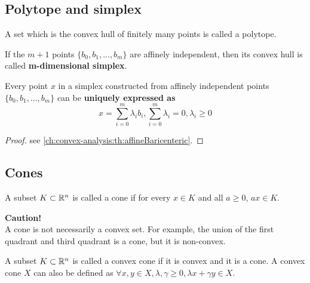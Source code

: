 \begin{refsection}
\subsection{Polytope and simplex}
\begin{definition}[polytope]\cite[12]{rockafellar1997convex}
A set which is the convex hull of finitely many points is called a polytope.
\end{definition}

\begin{definition}[simplex]\cite[12]{rockafellar1997convex}
If the $m+1$ points $\{b_0,b_1,...,b_m\}$ are affinely independent, then its convex hull is called \textbf{m-dimensional simplex}.
\end{definition}


\begin{theorem}
Every point $x$ in a simplex constructed from affinely independent points $\{b_0,b_1,...,b_m\}$ can be \textbf{uniquely expressed as}
$$x = \sum_{i=0}^m \lambda_i b_i, \sum_{i=0}^m \lambda_i = 0,\lambda_i \geq 0$$
\end{theorem}
\begin{proof}
see \autoref{ch:convex-analysis:th:affineBaricenteric}.
\end{proof}


\subsection{Cones}

\begin{definition}[cone]
	A subset $K \subset \mathbb{R}^n$ is called a cone if for every $x\in K$ and all $a \geq 0$, $ax\in K$.
\end{definition}

\begin{mdframed}
	\textbf{Caution!}\\
	A cone is not necessarily a convex set. For example, the union of the first quadrant and third quadrant is a cone, but it is non-convex.
\end{mdframed}


\begin{definition}
	A subset $K \subset \mathbb{R}^n$ is called a convex cone if it is convex and it is a cone. A convex cone $X$ can also be defined as
	$\forall x,y\in X,\lambda,\gamma \geq 0, \lambda x + \gamma y \in X$.	
\end{definition}


\end{refsection}
